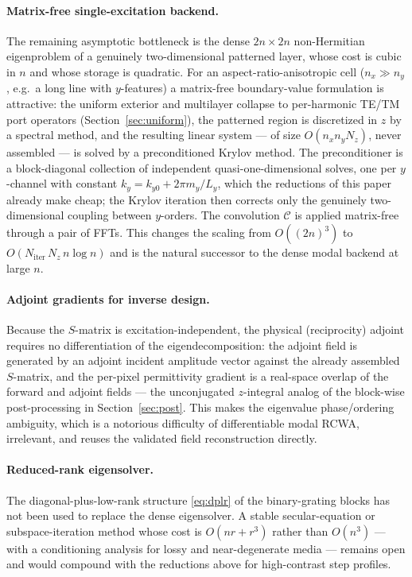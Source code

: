 \documentclass[11pt]{article}
\theoremstyle{remark}
\newcommand{\Cmat}{\mathcal{C}}
\begin{document}
\paragraph{Matrix-free single-excitation backend.}
The remaining asymptotic bottleneck is the dense $2n\times2n$ non-Hermitian
eigenproblem of a genuinely two-dimensional patterned layer, whose cost is
cubic in $n$ and whose storage is quadratic.  For an aspect-ratio-anisotropic
cell ($n_x\gg n_y$, e.g.\ a long line with $y$-features) a matrix-free
boundary-value formulation is attractive: the uniform exterior and multilayer
collapse to per-harmonic TE/TM port operators (Section~\ref{sec:uniform}), the
patterned region is discretized in $z$ by a spectral method, and the resulting
linear system --- of size $O(n_x n_y N_z)$, never assembled --- is solved by a
preconditioned Krylov method.  The preconditioner is a block-diagonal
collection of independent quasi-one-dimensional solves, one per $y$-channel
with constant $k_y=k_{y0}+2\pi m_y/L_y$, which the reductions of this paper
already make cheap; the Krylov iteration then corrects only the genuinely
two-dimensional coupling between $y$-orders.  The convolution $\Cmat$ is
applied matrix-free through a pair of FFTs.  This changes the scaling from
$O((2n)^3)$ to $O(N_{\mathrm{iter}}\,N_z\,n\log n)$ and is the natural
successor to the dense modal backend at large $n$.

\paragraph{Adjoint gradients for inverse design.}
Because the $S$-matrix is excitation-independent, the physical (reciprocity)
adjoint requires no differentiation of the eigendecomposition: the adjoint
field is generated by an adjoint incident amplitude vector against the already
assembled $S$-matrix, and the per-pixel permittivity gradient is a real-space
overlap of the forward and adjoint fields --- the unconjugated $z$-integral
analog of the block-wise post-processing in Section~\ref{sec:post}.  This
makes the eigenvalue phase/ordering ambiguity, which is a notorious difficulty
of differentiable modal RCWA, irrelevant, and reuses the validated field
reconstruction directly.

\paragraph{Reduced-rank eigensolver.}
The diagonal-plus-low-rank structure \eqref{eq:dplr} of the binary-grating
blocks has not been used to replace the dense eigensolver.  A stable
secular-equation or subspace-iteration method whose cost is $O(nr+r^3)$ rather
than $O(n^3)$ --- with a conditioning analysis for lossy and near-degenerate
media --- remains open and would compound with the reductions above for
high-contrast step profiles.
\end{document}
